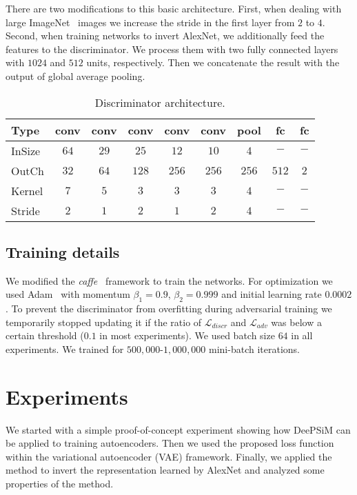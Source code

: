 \documentclass{article}
\newcommand{\ourapproach}{DeePSiM }
\newcommand{\loss}{\mathcal{L}}
\newcommand{\discrloss}{\loss_{adv}}
\begin{document}
There are two modifications to this basic architecture.
First, when dealing with large ImageNet~\citep{imagenet} images we increase the stride in the first layer from $2$ to $4$.
Second, when training networks to invert AlexNet, we additionally feed the features to the discriminator.
We process them with two fully connected layers with $1024$ and $512$ units, respectively. 
Then we concatenate the result with the output of global average pooling.

\begin{table}
   \begin{center}
   \setlength{\tabcolsep}{0.15cm}
  \small{
  \begin{tabular}{|l|cccccccc|}
      \hline
      \small{Type}   & conv  & conv & conv  & conv  & conv  & pool  & fc    & fc   \\ \hline
      \small{InSize} & $64$  & $29$ & $25$  & $12$  & $10$  & $4$   & $-$   & $-$  \\
      \small{OutCh}  & $32$  & $64$ & $128$ & $256$ & $256$ & $256$ & $512$ & $2$  \\
      \small{Kernel}    & $7$   & $5$  & $3$   & $3$   & $3$   & $4$   & $-$   & $-$  \\
      \small{Stride}    & $2$   & $1$  & $2$   & $1$   & $2$   & $4$   & $-$   & $-$  \\
      \hline
    \end{tabular}}
  \end{center}
  \caption{Discriminator architecture. }
  \label{tbl:discriminator_arch}
\end{table}

\subsection{Training details}

We modified the \emph{caffe}~\citep{caffe} framework to train the networks.
For optimization we used Adam~\citep{Kingma_ICLR2015} with momentum $\beta_1=0.9$, $\beta_2=0.999$ and initial learning rate $0.0002$.
To prevent the discriminator from overfitting during adversarial training we temporarily stopped updating it if the ratio of $\mathcal{L}_{discr}$ and $\discrloss$ was below a certain threshold ($0.1$ in most experiments). 
We used batch size $64$ in all experiments. 
We trained for $500,000$-$1,000,000$ mini-batch iterations.

\section{Experiments}
We started with a simple proof-of-concept experiment showing how \ourapproach can be applied to training autoencoders.
Then we used the proposed loss function within the variational autoencoder (VAE) framework.
Finally, we applied the method to invert the representation learned by AlexNet and analyzed some properties of the method.
\end{document}
